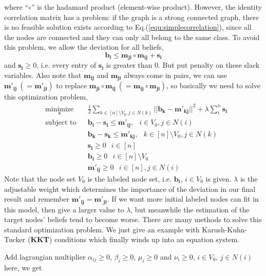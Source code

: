 where ``$\circ$'' is the hadamard product (element-wise product). However, the identity correlation matrix has a problem: if the graph is a strong connected graph, there is no feasible solution exists according to Eq.(\ref{equ:simplecorrelation}), since all the nodes are connected and they can only all belong to the same class. To avoid this problem, we allow the deviation for all beliefs,
$$\mathbf{b_i}  \leq \mathbf{m_{ji}}\circ \mathbf{m_{ij}} + \mathbf{s_i}$$
and $\mathbf{s_i} \geq 0$, i.e. every entry of $\mathbf{s_i}$ is greater than $0$. But put penalty on these slack variables. Also note that $\mathbf{m_{ij}}$ and $\mathbf{m_{ji}}$ always come in pairs, we can use $\mathbf{m'_{ij}} ~(= \mathbf{m'_{ji}})$ to replace $\mathbf{m_{ji}}\circ \mathbf{m_{ij}} ~(= \mathbf{m_{ij}}\circ \mathbf{m_{ji}})$, so basically we need to solve this optimization problem,
\begin{equation}
\begin{aligned}
& \underset{\mathbf{s}}{\text{minimize}}
& & \frac{1}{2}\mathop{\sum}_{k \in [n]\setminus V_0, j\in N(k)}||\mathbf{b_k} - \mathbf{m'_{kj}}||^2 + \lambda \sum_i^n\mathbf{s_i} \\
& \text{subject to}
& &  \mathbf{b_i}-\mathbf{s_i} \leq \mathbf{m'_{ij}}, ~~\; i \in V_0, j\in N(i)\\
& &  &\mathbf{b_k}-\mathbf{s_k} \leq \mathbf{m'_{kj}}, ~~\; k \in [n]\setminus V_0, j\in N(k)\\
& &  &\mathbf{s_i}\geq 0 ~~\; i \in [n]\\
& &  &\mathbf{b_i}\geq 0 ~~\; i \in [n]\setminus V_0\\
& &  &\mathbf{m'_{ij}}\geq 0 ~~\; i \in [n], j\in N(i)
\end{aligned}
\end{equation}
Note that the node set $V_0$ is the labeled node set, i.e. $\mathbf{b_i}$, $i\in V_0$ is given. $\lambda$ is the adjustable weight which determines the importance of the deviation in our final result and remember $\mathbf{m'_{ij}} = \mathbf{m'_{ji}}$. If we want more initial labeled nodes can fit in this model, then give a larger value to $\lambda$, but meanwhile the estimation of the target nodes' beliefs tend to become worse. There are many methods to solve this standard optimization problem. We just give an example with Karush-Kuhn-Tucker (\textbf{KKT}) conditions which finally winds up into an equation system.

Add lagrangian multiplier $\alpha_{ij} \geq 0$, $\beta_i \geq 0$, $\mu_i \geq 0$ and $\nu_i\geq 0$, $i\in V_0$, $j\in N(i)$  here, we get

